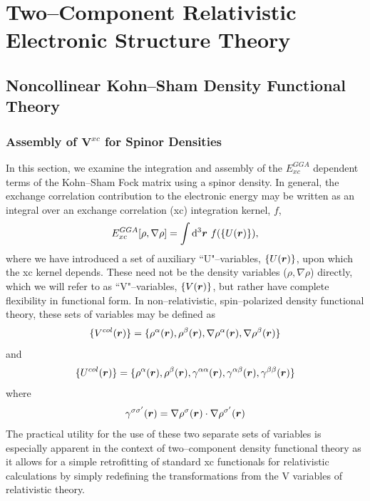 \chapter{Two--Component Relativistic Electronic Structure Theory}


\section{Noncollinear Kohn--Sham Density Functional Theory}
\label{sec:NCDFT}

\subsection{Assembly of $\mathbf{V}^{xc}$ for Spinor Densities}

In this section, we examine the integration and assembly of the $E^{GGA}_{xc}$ dependent terms of
the Kohn--Sham Fock matrix using a spinor density. In general, the exchange correlation contribution to the
electronic energy may be written as an integral over an exchange correlation (xc) integration kernel, $f$,
\begin{equation}
  \label{eq:EXCGGA}
E_{xc}^{GGA}[\rho, \nabla \rho] = \int \mathrm{d}^3 \boldsymbol{r} \text{  }f(\{ U(\boldsymbol{r}) \}) ,
\end{equation}
where we have introduced a set of auxiliary ``U"--variables, $\{U(\boldsymbol{r})\}$, upon which
the xc kernel depends. These need not be the density variables ($\rho, \nabla \rho$) directly,
which we will refer to as ``V"--variables, $\{V(\boldsymbol{r})\}$, but rather have complete flexibility in
functional form. In non--relativistic, spin--polarized density functional theory, these sets of variables
may be defined as
\begin{equation}
  \label{eq:Vcol}
  \{ V^{col}(\boldsymbol{r}) \} = \{ \rho^\alpha(\boldsymbol{r}), \rho^\beta(\boldsymbol{r}), \nabla \rho^\alpha(\boldsymbol{r}), \nabla \rho^\beta(\boldsymbol{r}) \} 
\end{equation}
and
\begin{equation}
  \label{eq:Ucol}
  \{ U^{col}(\boldsymbol{r}) \} = \{ \rho^\alpha(\boldsymbol{r}), \rho^\beta(\boldsymbol{r}), \gamma^{\alpha\alpha}(\boldsymbol{r}), \gamma^{\alpha\beta}(\boldsymbol{r}), \gamma^{\beta\beta}(\boldsymbol{r}) \}
\end{equation}
where
\begin{equation}
  \gamma^{\sigma\sigma'}(\boldsymbol{r}) = \nabla \rho^\sigma(\boldsymbol{r}) \cdot \nabla \rho^{\sigma'}(\boldsymbol{r})
\end{equation}
The practical utility for the use of these two separate sets of variables 
is especially apparent in the context of two--component density functional theory
as it allows for a simple retrofitting of standard xc functionals for relativistic calculations
by simply redefining the transformations from the V variables of relativistic theory. 

